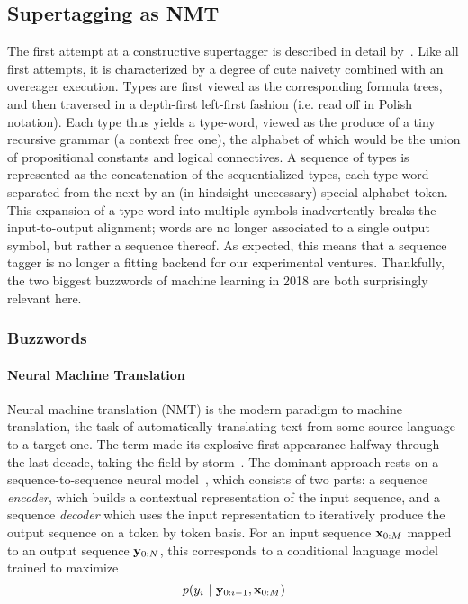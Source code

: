 \subsection{Supertagging as NMT}
\label{subsection:snmt}
The first attempt at a constructive supertagger is described in detail by~\citet{kogkalidis-etal-2019-constructive}.
Like all first attempts, it is characterized by a degree of cute naivety combined with an overeager execution.
Types are first viewed as the corresponding formula trees, and then traversed in a depth-first left-first fashion (i.e. read off in Polish notation).
Each type thus yields a type-word, viewed as the produce of a tiny recursive grammar (a context free one), the alphabet of which would be the union of propositional constants and logical connectives.
A sequence of types is represented as the concatenation of the sequentialized types, each type-word separated from the next by an (in hindsight unecessary) special alphabet token.
This expansion of a type-word into multiple symbols inadvertently breaks the input-to-output alignment; words are no longer associated to a single output symbol, but rather a sequence thereof.
As expected, this means that a sequence tagger is no longer a fitting backend for our experimental ventures.
Thankfully, the two biggest buzzwords of machine learning in 2018 are both surprisingly relevant here.

\subsubsection{Buzzwords}
\paragraph{Neural Machine Translation} Neural machine translation (NMT) is the modern paradigm to machine translation, the task of automatically translating text from some source language to a target one.
The term made its explosive first appearance halfway through the last decade, taking the field by storm~\cite{kalchbrenner2013recurrent,cho2014learning,bahdanau2015neural}.
The dominant approach rests on a sequence-to-sequence neural model~\cite{cho2014learning,NIPS2014_a14ac55a}, which consists of two parts: a sequence \textit{encoder}, which builds a contextual representation of the input sequence, and a sequence \textit{decoder} which uses the input representation to iteratively produce the output sequence on a token by token basis.
For an input sequence $\mathbf{x}_{0:M}$ mapped to an output sequence $\mathbf{y}_{0:N}$, this corresponds to a conditional language model trained to maximize
\begin{equation}
	p(y_i \ | \ \seq{y}{0:i-1},\seq{x}{0:M})
\end{equation}


